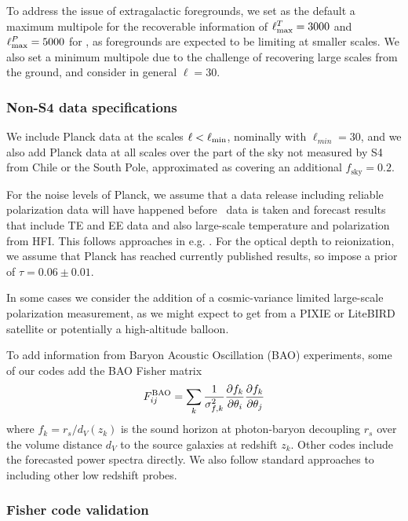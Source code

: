 To address the issue of extragalactic foregrounds, we set as the default a maximum multipole for the recoverable information of $\ell^T_{\rm max} = 3000$ and $\ell^P_{\rm max} = 5000$ for \cmbexp, as foregrounds are expected to be limiting at smaller scales. We also set a minimum multipole due to the challenge of recovering large scales from the ground, and consider in general $\ell=30$. 

\subsubsection{Non-S4 data specifications}

We include Planck data at the scales $\ell<\ell_{\rm min}$, nominally with $\ell_{min}=30$, and we also add Planck data at all scales over the part of the sky not measured by S4 from Chile or the South Pole, approximated as covering an additional $f_\mathrm{sky}=0.2$.

For the noise levels of Planck, we assume that a data release including reliable polarization data will have happened before \cmbexp\ data is taken and forecast results that include TE and EE data and also large-scale temperature and polarization from HFI. This follows approaches in e.g. \cite{Allison:2015qca}. For the optical depth to reionization, we assume that Planck has reached currently published results, so impose a prior of $\tau=0.06\pm0.01$.

In some cases we consider the addition of a cosmic-variance limited large-scale polarization measurement, as we might expect to get from a PIXIE or LiteBIRD satellite or potentially a high-altitude balloon.

To add information from Baryon Acoustic Oscillation (BAO) experiments, some of our codes add the BAO Fisher matrix
%
\begin{equation}
F_{ij}^{\rm BAO} = \sum_{k} \frac{1}{\sigma_{f,k}^2}\frac{\partial f_k}{\partial \theta_i}\frac{\partial f_k}{\partial \theta_j}
\end{equation}
%
where $f_k = r_s/d_V(z_k)$ is the sound horizon at photon-baryon decoupling $r_s$ over the volume distance $d_V$ to the source galaxies at redshift $z_k$. Other codes include the forecasted power spectra directly. We also follow standard approaches to including other low redshift probes.

\subsubsection{Fisher code validation}

